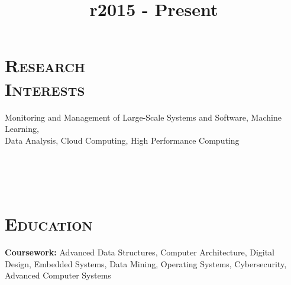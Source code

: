 
\hypersetup{backref,pdfpagemode=Full,colorlinks=false,backref}

\addtolength{\oddsidemargin}{-0.45in}
\addtolength{\voffset}{-0.30in}
\addtolength{\textwidth}{1.00in} \addtolength{\textheight}{1.50in}

\renewcommand{\namefont}{\LARGE\emph}

\def\Cplusplus{{\rm C\raise.25ex\hbox{\small ++}}}




\address{
}
\address{
	+1 857 540 8435~~~
  \href{mailto:ates@bu.edu}{ates@bu.edu} 
  \hphantom{Apt. 2 Brookline}
}

\begin{resume}
	
	\section{\textsc{Research\\Interests}}
	Monitoring and Management of Large-Scale Systems and Software, Machine
  Learning,\\
  Data Analysis, Cloud Computing, High Performance Computing 
	
	\begin{formatb}
		\title{r}\\
		\\
		\body\\
	\end{formatb}
	
	\section{\textsc{Education}}
	
	\title{2015 - Present}
	\begin{position}
    \textbf{Coursework:} Advanced Data Structures, Computer Architecture,
    Digital Design, Embedded Systems, Data Mining, Operating Systems,
    Cybersecurity, Advanced Computer Systems
	\end{position}
	

\end{resume}
